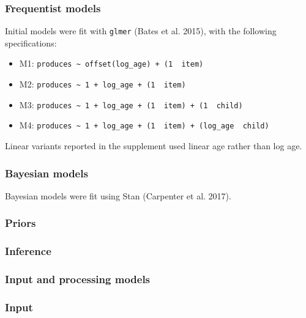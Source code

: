 \documentclass[
  11pt,
]{article}
\providecommand{\tightlist}{%
  \setlength{\itemsep}{0pt}\setlength{\parskip}{0pt}}
\begin{document}
\subsubsection{Frequentist models}\label{frequentist-models}

Initial models were fit with \texttt{glmer} (Bates et al. 2015), with
the following specifications:

\begin{itemize}
\tightlist
\item
  M1:
  \texttt{produces\ \textasciitilde{}\ offset(log\_age)\ +\ (1\ \textbar{}\ item)}
\item
  M2:
  \texttt{produces\ \textasciitilde{}\ 1\ +\ log\_age\ +\ (1\ \textbar{}\ item)}
\item
  M3:
  \texttt{produces\ \textasciitilde{}\ 1\ +\ log\_age\ +\ (1\ \textbar{}\ item)\ +\ (1\ \textbar{}\ child)}
\item
  M4:
  \texttt{produces\ \textasciitilde{}\ 1\ +\ log\_age\ +\ (1\ \textbar{}\ item)\ +\ (log\_age\ \textbar{}\ child)}
\end{itemize}

Linear variants reported in the supplement used linear age rather than
log age.

\subsubsection{Bayesian models}\label{bayesian-models}

Bayesian models were fit using Stan (Carpenter et al. 2017).

\subsubsection{Priors}\label{priors}

\subsubsection{Inference}\label{inference}

\subsubsection{Input and processing
models}\label{input-and-processing-models}

\subsubsection{Input}\label{input}
\end{document}
